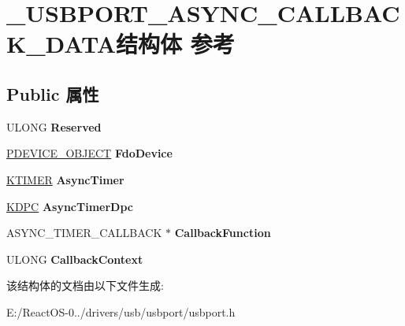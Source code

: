 \hypertarget{struct___u_s_b_p_o_r_t___a_s_y_n_c___c_a_l_l_b_a_c_k___d_a_t_a}{}\section{\+\_\+\+U\+S\+B\+P\+O\+R\+T\+\_\+\+A\+S\+Y\+N\+C\+\_\+\+C\+A\+L\+L\+B\+A\+C\+K\+\_\+\+D\+A\+T\+A结构体 参考}
\label{struct___u_s_b_p_o_r_t___a_s_y_n_c___c_a_l_l_b_a_c_k___d_a_t_a}
\subsection*{Public 属性}
\begin{DoxyCompactItemize}
\item 
\mbox{\label{struct___u_s_b_p_o_r_t___a_s_y_n_c___c_a_l_l_b_a_c_k___d_a_t_a_a81dca1e41a4da9dd6161b97cc2e9740a}} 
U\+L\+O\+NG {\bfseries Reserved}
\item 
\mbox{\label{struct___u_s_b_p_o_r_t___a_s_y_n_c___c_a_l_l_b_a_c_k___d_a_t_a_a0ab48ad1110ba7374ba3c98461c853a4}} 
\hyperlink{struct___d_e_v_i_c_e___o_b_j_e_c_t}{P\+D\+E\+V\+I\+C\+E\+\_\+\+O\+B\+J\+E\+CT} {\bfseries Fdo\+Device}
\item 
\mbox{\label{struct___u_s_b_p_o_r_t___a_s_y_n_c___c_a_l_l_b_a_c_k___d_a_t_a_a047c6142d4821f05c4be223e57a2328e}} 
\hyperlink{struct___k_t_i_m_e_r}{K\+T\+I\+M\+ER} {\bfseries Async\+Timer}
\item 
\mbox{\label{struct___u_s_b_p_o_r_t___a_s_y_n_c___c_a_l_l_b_a_c_k___d_a_t_a_a6e532366ae8d784f46ed0768828e79e3}} 
\hyperlink{struct___k_d_p_c}{K\+D\+PC} {\bfseries Async\+Timer\+Dpc}
\item 
\mbox{\label{struct___u_s_b_p_o_r_t___a_s_y_n_c___c_a_l_l_b_a_c_k___d_a_t_a_ad896fb4c22a405027e48120b3092ff2e}} 
A\+S\+Y\+N\+C\+\_\+\+T\+I\+M\+E\+R\+\_\+\+C\+A\+L\+L\+B\+A\+CK $\ast$ {\bfseries Callback\+Function}
\item 
\mbox{\label{struct___u_s_b_p_o_r_t___a_s_y_n_c___c_a_l_l_b_a_c_k___d_a_t_a_a2362e4648f45d8c8f1db3dd3b1f264c3}} 
U\+L\+O\+NG {\bfseries Callback\+Context}
\end{DoxyCompactItemize}


该结构体的文档由以下文件生成\+:\begin{DoxyCompactItemize}
\item 
E\+:/\+React\+O\+S-\/0../drivers/usb/usbport/usbport.\+h\end{DoxyCompactItemize}
